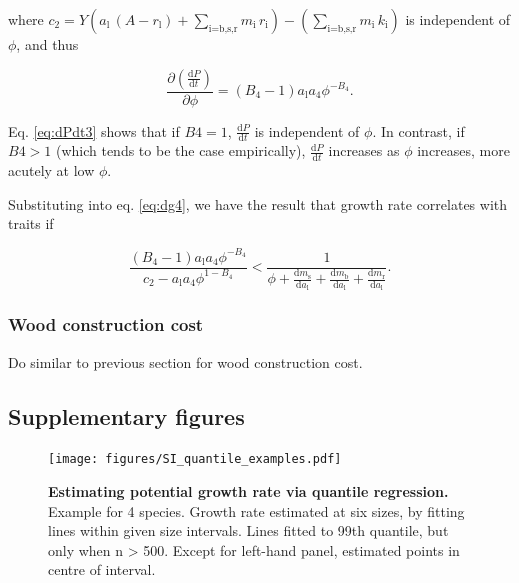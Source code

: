 \documentclass[12pt, a4paper]{article}
\begin{document}
where
\(c_2 = Y ( a_\textrm{l} \, (A - r_\textrm{l}) + \sum_\textrm{i=b,s,r}{m_\textrm{i} \, r_\textrm{i}}) - (\sum_\textrm{i=b,s,r}{m_\textrm{i} \, k_\textrm{i}})\)
is independent of \(\phi\), and thus

\begin{equation}\label{eq:dPdt3}
\frac{\partial \left( \frac{ \textrm{d}P} {\textrm{d}t}\right)}{\partial \phi}  =
(B_4-1) a_\textrm{l} a_4\phi ^{-B_4}.
\end{equation}

Eq. \ref{eq:dPdt3} shows that if \(B4=1\), \(\frac{ \textrm{d}P} {\textrm{d}t}\) is independent
of $\phi$. In contrast, if \(B4>1\) (which tends to be the case empirically), \(\frac{ \textrm
{d}P} {\textrm{d}t}\) increases as $\phi$ increases, more acutely at low $\phi$.

Substituting into eq. \ref{eq:dg4}, we have the result that growth rate correlates
with traits if

\begin{equation} \label{eq:G6}
\frac{(B_4-1) a_\textrm{l} a_4\phi ^{-B_4}}{c_2 - a_\textrm{l} a_4 \phi ^{1-B_4}}
< \frac{1}{\phi
 + \frac{\textrm{d}m_\textrm{s}}{\textrm{d}a_\textrm{l}} + \frac{\textrm{d}m_\textrm
 {b}}{\textrm{d}a_\textrm{l}} + \frac{\textrm{d}m_\textrm{r}}{\textrm{d}a_\textrm{l}}}.
\end{equation}

\subsubsection{Wood construction cost}

Do similar to previous section for wood construction cost.



\subsection{Supplementary figures}\label{supplementary-figures}

\begin{figure}[htbp]
\centering
\texttt{[image: figures/SI\_quantile\_examples.pdf]}
\caption{\textbf{Estimating potential growth rate via quantile
regression.} Example for 4 species. Growth rate estimated at six sizes,
by fitting lines within given size intervals. Lines fitted to 99th
quantile, but only when n \textgreater{} 500. Except for left-hand
panel, estimated points in centre of interval.
\label{fS-quantile_examples}}
\end{figure}
\end{document}
